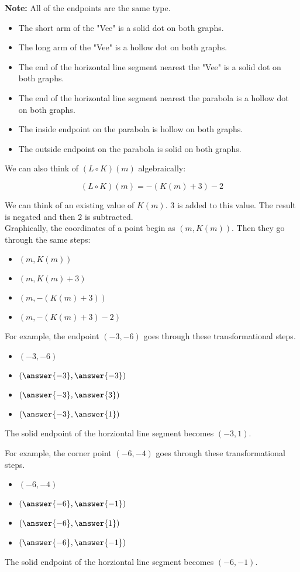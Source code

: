 \documentclass{ximera}
\begin{document}
\textbf{Note:} All of the endpoints are the same type.  

\begin{itemize}
\item The short arm of the "Vee" is a solid dot on both graphs.
\item The long arm of the "Vee" is a hollow dot on both graphs.
\item The end of the horizontal line segment nearest the "Vee" is a solid dot on both graphs.
\item The end of the horizontal line segment nearest the parabola is a hollow dot on both graphs.
\item The inside endpoint on the parabola is hollow on both graphs.
\item The outside endpoint on the parabola is solid on both graphs.
\end{itemize}



We can also think of $(L \circ K)(m)$ algebraically:


\[
(L \circ K)(m) = -(K(m)+3) - 2
\]


We can think of an existing value of $K(m)$.  $3$ is added to this value. The result is negated and then $2$ is subtracted. \\

Graphically, the coordinates of a point begin as $(m, K(m))$.  Then they go through the same steps: 


\begin{itemize}
\item $(m, K(m))$
\item $(m, K(m) + 3)$
\item $(m, -(K(m) + 3))$
\item $(m, -(K(m) + 3) - 2)$
\end{itemize}


For example, the endpoint $(-3, -6)$ goes through these transformational steps.

\begin{itemize}
\item $(-3, -6)$
\item $\left( \answer{-3},  \answer{-3} \right)$
\item $\left( \answer{-3},  \answer{3} \right)$
\item $\left( \answer{-3},  \answer{1} \right)$
\end{itemize}

The solid endpoint of the horziontal line segment becomes $(-3, 1)$.



For example, the corner point $(-6, -4)$ goes through these transformational steps.

\begin{itemize}
\item $(-6, -4)$
\item $\left( \answer{-6},  \answer{-1} \right)$
\item $\left( \answer{-6},  \answer{1} \right)$
\item $\left( \answer{-6},  \answer{-1} \right)$
\end{itemize}

The solid endpoint of the horziontal line segment becomes $(-6, -1)$.
\end{document}
